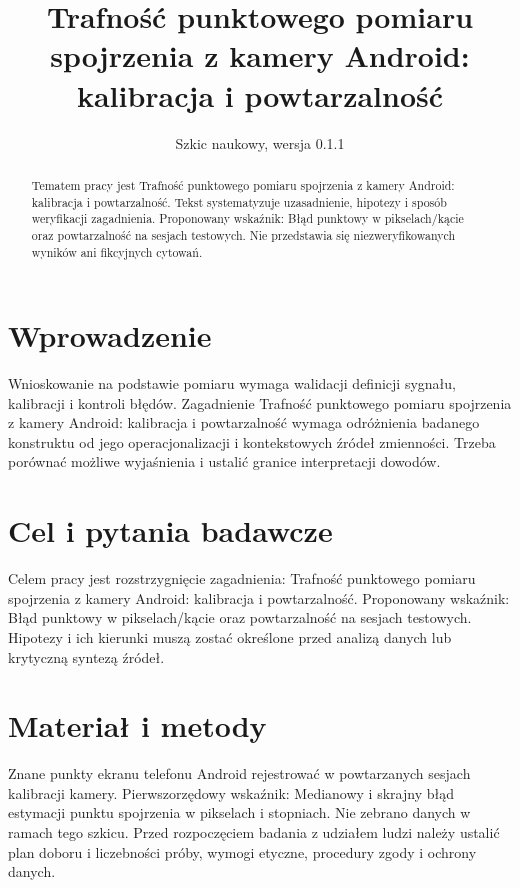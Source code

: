 \documentclass[11pt,a4paper]{article}
\title{Trafność punktowego pomiaru spojrzenia z kamery Android: kalibracja i powtarzalność}
\author{}
\date{Szkic naukowy, wersja 0.1.1}
\begin{document}
\maketitle

\begin{abstract}

Tematem pracy jest Trafność punktowego pomiaru spojrzenia z kamery Android: kalibracja i powtarzalność. Tekst systematyzuje uzasadnienie, hipotezy i sposób weryfikacji zagadnienia. Proponowany wskaźnik: Błąd punktowy w pikselach/kącie oraz powtarzalność na sesjach testowych. Nie przedstawia się niezweryfikowanych wyników ani fikcyjnych cytowań.

\end{abstract}

\section{Wprowadzenie}

Wnioskowanie na podstawie pomiaru wymaga walidacji definicji sygnału, kalibracji i kontroli błędów. Zagadnienie Trafność punktowego pomiaru spojrzenia z kamery Android: kalibracja i powtarzalność wymaga odróżnienia badanego konstruktu od jego operacjonalizacji i kontekstowych źródeł zmienności. Trzeba porównać możliwe wyjaśnienia i ustalić granice interpretacji dowodów.

\section{Cel i pytania badawcze}

Celem pracy jest rozstrzygnięcie zagadnienia: Trafność punktowego pomiaru spojrzenia z kamery Android: kalibracja i powtarzalność. Proponowany wskaźnik: Błąd punktowy w pikselach/kącie oraz powtarzalność na sesjach testowych. Hipotezy i ich kierunki muszą zostać określone przed analizą danych lub krytyczną syntezą źródeł.

\section{Materiał i metody}

Znane punkty ekranu telefonu Android rejestrować w powtarzanych sesjach kalibracji kamery. Pierwszorzędowy wskaźnik: Medianowy i skrajny błąd estymacji punktu spojrzenia w pikselach i stopniach. Nie zebrano danych w ramach tego szkicu. Przed rozpoczęciem badania z udziałem ludzi należy ustalić plan doboru i liczebności próby, wymogi etyczne, procedury zgody i ochrony danych.
\end{document}
